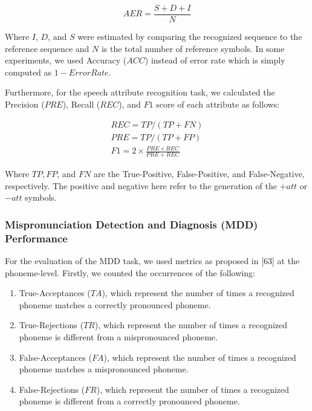 \documentclass[12pt]{elsarticle}
\begin{document}
\begin{equation}
    AER = \frac{S+D+I}{N}
\end{equation}

Where $I$, $D$, and $S$ were estimated by comparing the recognized sequence to the reference sequence and $N$ is the total number of reference symbols. In some experiments, we used Accuracy ($ACC$) instead of error rate which is simply computed as $1-Error Rate$.

Furthermore, for the speech attribute recognition task, we calculated the Precision ($PRE$), Recall ($REC$), and $F1$ score of each attribute as follows:

\begin{equation}
\begin{aligned}
    REC = TP/(TP+FN) \\ 
    PRE = TP/(TP+FP) \\ 
    F1 = 2\times \frac{PRE \times REC}{PRE+REC}
\end{aligned}
 \end{equation}

 Where $TP, FP$, and $FN$ are the True-Positive, False-Positive, and False-Negative, respectively. The positive and negative here refer to the generation of the $+att$ or $-att$ symbols.

 \subsubsection{Mispronunciation Detection and Diagnosis (MDD) Performance}
 For the evaluation of the MDD task, we used metrics as proposed in [63] at the phoneme-level. Firstly, we counted the occurrences of the following:

 \begin{enumerate}
     \item 	True-Acceptances ($TA$), which represent the number of times a recognized phoneme matches a correctly pronounced phoneme.
     \item True-Rejections ($TR$), which represent the number of times a recognized phoneme is different from a mispronounced phoneme.
     \item False-Acceptances ($FA$), which represent the number of times a recognized phoneme matches a mispronounced phoneme.
     \item False-Rejections ($FR$), which represent the number of times a recognized phoneme is different from a correctly pronounced phoneme.
 \end{enumerate}
\end{document}
